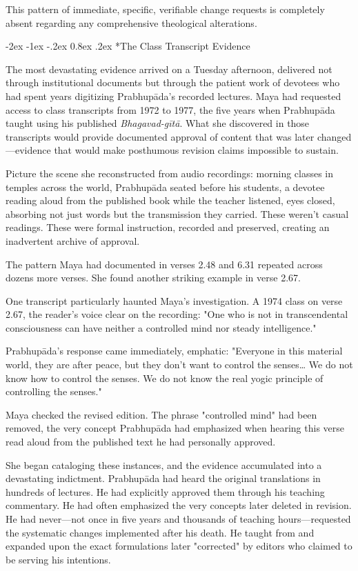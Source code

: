 \documentclass[12pt,twoside]{book}
\makeatletter
\let\oldsubsection\subsection
\renewcommand{\subsection}[1]{\needspace{3\baselineskip}\oldsubsection{#1}}
\renewcommand\subsection{\@startsection{subsection}{2}{\z@}%
{-2ex \@plus -1ex \@minus -.2ex}%
{0.8ex \@plus .2ex}%
{\normalfont\large\bfseries}}
\makeatother
\begin{document}
This pattern of immediate, specific, verifiable change requests is completely absent regarding any comprehensive theological alterations.


\vspace{0.1cm}
\subsection*{The Class Transcript Evidence}

The most devastating evidence arrived on a Tuesday afternoon, delivered not through institutional documents but through the patient work of devotees who had spent years digitizing Prabhupāda's recorded lectures. Maya had requested access to class transcripts from 1972 to 1977, the five years when Prabhupāda taught using his published \emph{Bhagavad-gītā}. What she discovered in those transcripts would provide documented approval of content that was later changed—evidence that would make posthumous revision claims impossible to sustain.

Picture the scene she reconstructed from audio recordings: morning classes in temples across the world, Prabhupāda seated before his students, a devotee reading aloud from the published book while the teacher listened, eyes closed, absorbing not just words but the transmission they carried. These weren't casual readings. These were formal instruction, recorded and preserved, creating an inadvertent archive of approval.

The pattern Maya had documented in verses 2.48 and 6.31 repeated across dozens more verses. She found another striking example in verse 2.67.

One transcript particularly haunted Maya's investigation. A 1974 class on verse 2.67, the reader's voice clear on the recording: "One who is not in transcendental consciousness can have neither a controlled mind nor steady intelligence."

Prabhupāda's response came immediately, emphatic: "Everyone in this material world, they are after peace, but they don't want to control the senses\ldots{} We do not know how to control the senses. We do not know the real yogic principle of controlling the senses."

Maya checked the revised edition. The phrase "controlled mind" had been removed, the very concept Prabhupāda had emphasized when hearing this verse read aloud from the published text he had personally approved.

She began cataloging these instances, and the evidence accumulated into a devastating indictment. Prabhupāda had heard the original translations in hundreds of lectures. He had explicitly approved them through his teaching commentary. He had often emphasized the very concepts later deleted in revision. He had never—not once in five years and thousands of teaching hours—requested the systematic changes implemented after his death. He taught from and expanded upon the exact formulations later "corrected" by editors who claimed to be serving his intentions.
\end{document}

